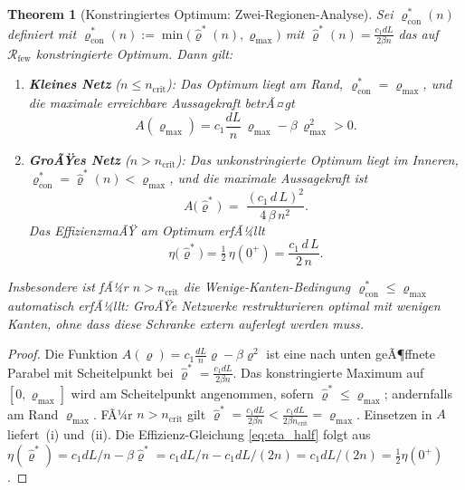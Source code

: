 ﻿\documentclass[12pt, a4paper, openany]{report}
\newtheorem{theorem}{Theorem}[chapter]
\newcommand{\calR}{\mathcal{R}}
\begin{document}
\begin{theorem}[Konstringiertes Optimum: Zwei-Regionen-Analyse]
\label{thm:scaling}
Sei $\varrho^*_{\mathrm{con}}(n)$ definiert mit $\varrho^*_{\mathrm{con}}(n) := \min\!\bigl(\hat{\varrho}^*(n),
\varrho_{\max}\bigr)$ mit $\hat{\varrho}^*(n) = \frac{c_1 d L}{2\beta n}$
das auf $\calR_{\mathrm{few}}$ konstringierte Optimum.  Dann gilt:
\begin{enumerate}[label=(\roman*)]
  \item \textbf{Kleines Netz} ($n \leq n_{\mathrm{crit}}$):
    Das Optimum liegt am Rand, $\varrho^*_{\mathrm{con}} = \varrho_{\max}$,
    und die maximale erreichbare Aussagekraft betrÃ¤gt
    \[
      A(\varrho_{\max})
      = c_1 \frac{d L}{n}\,\varrho_{\max} - \beta\,\varrho_{\max}^2
      > 0.
    \]
  \item \textbf{GroÃŸes Netz} ($n > n_{\mathrm{crit}}$):
    Das unkonstringierte Optimum liegt im Inneren,
    $\varrho^*_{\mathrm{con}} = \hat{\varrho}^*(n) < \varrho_{\max}$,
    und die maximale Aussagekraft ist
    \begin{equation}
      \label{eq:A_opt}
      A\!\bigl(\hat{\varrho}^*\bigr)
      \;=\; \frac{(c_1\,d\,L)^2}{4\,\beta\,n^2}.
    \end{equation}
    Das EffizienzmaÃŸ am Optimum erfÃ¼llt
    \begin{equation}
      \label{eq:eta_half}
      \eta\!\bigl(\hat{\varrho}^*\bigr) = \tfrac{1}{2}\,\eta(0^+)
      = \frac{c_1\,d\,L}{2\,n}.
    \end{equation}
\end{enumerate}
Insbesondere ist fÃ¼r $n > n_{\mathrm{crit}}$ die Wenige-Kanten-Bedingung
$\varrho^*_{\mathrm{con}} \leq \varrho_{\max}$ \emph{automatisch} erfÃ¼llt:
GroÃŸe Netzwerke restrukturieren optimal mit wenigen Kanten, ohne dass diese
Schranke extern auferlegt werden muss.
\end{theorem}

\begin{proof}
Die Funktion $A(\varrho) = c_1 \frac{dL}{n}\varrho - \beta\varrho^2$ ist eine
nach unten geÃ¶ffnete Parabel mit Scheitelpunkt bei
$\hat\varrho^* = \frac{c_1 dL}{2\beta n}$.
Das konstringierte Maximum auf $[0, \varrho_{\max}]$ wird am Scheitelpunkt
angenommen, sofern $\hat\varrho^* \leq \varrho_{\max}$; andernfalls am Rand
$\varrho_{\max}$.  FÃ¼r $n > n_{\mathrm{crit}}$ gilt
$\hat\varrho^* = \frac{c_1 dL}{2\beta n}
< \frac{c_1 dL}{2\beta n_{\mathrm{crit}}} = \varrho_{\max}$.
Einsetzen in $A$ liefert~(i) und~(ii).  Die Effizienz-Gleichung
\eqref{eq:eta_half} folgt aus $\eta(\hat\varrho^*) = c_1 dL/n
- \beta \hat\varrho^* = c_1 dL/n - c_1 dL/(2n) = c_1 dL/(2n)
= \tfrac{1}{2}\eta(0^+)$.
\end{proof}
\end{document}
